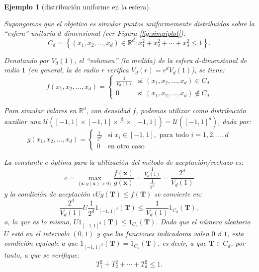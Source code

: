 \documentclass[
]{book}
\theoremstyle{break}
\newtheorem{example}{Ejemplo}[chapter]
\theoremstyle{nonumberplain}
\begin{document}
\begin{example}[distribución uniforme en la esfera]
\protect\hypertarget{exm:ar-esfera}{}\label{exm:ar-esfera}

Supongamos que el objetivo es simular puntos uniformemente distribuidos sobre la ``esfera'' unitaria \(d\)-dimensional (ver Figura \ref{fig:simpiplot}):
\[C_d=\left\{  \left( x_1, x_2, \ldots, x_d \right) \in \mathbb{R}^d
: x_1^2 + x_2^2 + \cdots + x_d^2 \leq1 \right\}.\]

Denotando por \(V_d\left( 1\right)\), el ``volumen'' (la medida) de la
esfera \(d\)-dimensional de radio \(1\) (en general, la de radio \(r\)
verifica \(V_d\left( r\right) =r^{d}V_d\left( 1\right)\)), se tiene:
\[f\left( x_1,x_2,\ldots,x_d\right)  =\left\{
\begin{array}{ll}
\frac{1}{V_d\left( 1\right)  } & \text{si } \left( x_1, x_2, \ldots
,x_d\right)  \in C_d\\
0 & \text{si } \left( x_1,x_2,\ldots,x_d\right)  \notin C_d
\end{array} \right.\]

Para simular valores en \(\mathbb{R}^{d}\), con densidad \(f\),
podemos utilizar como distribución auxiliar una
\(\mathcal{U}\left( \left[ -1,1\right] \times\left[ -1,1\right] \times\overset{\text{d}}{\cdots}\times\left[ -1,1\right] \right) = \mathcal{U}\left( \left[ -1,1\right]^{d}\right)\), dada por:
\[g\left( x_1,x_2,\ldots,x_d\right)  =\left\{
\begin{array}{ll}
\frac{1}{2^{d}} & \text{si } x_i\in\left[  -1,1\right], \text{ para todo }
i=1,2,\ldots,d\\
0 &  \text{en otro caso}
\end{array}\right.\]

La constante \(c\) óptima para la utilización del método de
aceptación/rechazo es:
\[c=\max_{\{\mathbf{x}:g\left( \mathbf{x}\right) > 0\}}
\frac{f\left( \mathbf{x}\right)  }{g\left( \mathbf{x}\right)  }
=\frac{\frac{1}{V_d\left( 1\right)  }}{\frac{1}{2^{d}}}
=\frac{2^{d}}{V_d\left( 1\right)}\]
y la condición de aceptación \(cUg\left( \mathbf{T}\right) \leq f\left( \mathbf{T}\right)\) se convierte en:
\[\frac{2^{d}}{V_d\left( 1\right)  }U\frac{1}{2^{d}}1_{\left[  -1,1\right]
^{d}}\left( \mathbf{T}\right)  \leq\frac{1}{V_d\left( 1\right)
}1_{C_d}\left( \mathbf{T}\right),\]
o, lo que es lo mismo, \(U1_{\left[ -1,1\right]^{d}}\left( \mathbf {T}\right) \leq1_{C_d}\left( \mathbf{T}\right)\).
Dado que el número aleatorio \(U\) está en el intervalo \((0,1)\) y que las funciones
indicadoras valen \(0\) ó \(1\), esta condición equivale a que \(1_{\left[ -1,1\right] ^{d}}\left( \mathbf{T}\right) =1_{C_d}\left( \mathbf{T}\right)\), es decir, a que
\(\mathbf{T}\in C_d\), por tanto, a que se verifique:
\[T_1^2+T_2^2+\cdots+T_d^2\leq1.\]


\end{example}
\end{document}
